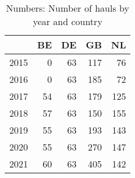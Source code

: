 \begin{table}[ht]
\centering
\begin{tabular}{rrrrr}
  \hline
 & BE & DE & GB & NL \\ 
  \hline
2015 & 0 & 63 & 117 & 76 \\ 
  2016 & 0 & 63 & 185 & 72 \\ 
  2017 & 54 & 63 & 179 & 125 \\ 
  2018 & 57 & 63 & 150 & 155 \\ 
  2019 & 55 & 63 & 193 & 143 \\ 
  2020 & 55 & 63 & 270 & 147 \\ 
  2021 & 60 & 63 & 405 & 142 \\ 
   \hline
\end{tabular}
\caption{Numbers: Number of hauls by year and country} 
\end{table}
